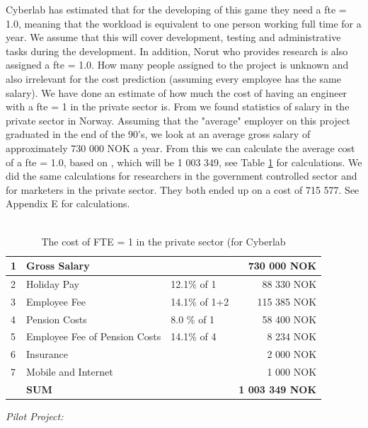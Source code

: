 Cyberlab has estimated that for the developing of this game they need a \ac{fte} = 1.0, meaning that the workload is equivalent to one person working full time for a year. We assume that this will cover development, testing and administrative tasks during the development. In addition, Norut who provides research is also assigned a \ac{fte} = 1.0. How many people assigned to the project is unknown and also irrelevant for the cost prediction (assuming every employee has the same salary). We have done an estimate of how much the cost of having an engineer with a \ac{fte} = 1 in the private sector is. From \cite{tekna} we found statistics of salary in the private sector in Norway. Assuming that the "average" employer on this project graduated in the end of the 90's, we look at an average gross salary of approximately 730 000 NOK a year. From this we can calculate the average cost of a \ac{fte} = 1.0, based on \cite{altinn}, which will be 1 003 349, see Table \ref{tab:costofFTE} for calculations. We did the same calculations for researchers in the government controlled sector and for marketers in the private sector. They both ended up on a cost of 715 577. See Appendix E for calculations.\\ \\
\begin{table}
\centering
    \begin{tabular}{|l|l|l|r|}
        \hline
       1&Gross Salary & & 730 000 NOK \\ \hline
       2&Holiday Pay & 12.1\% of 1  & 88 330 NOK \\ \hline
	   3&Employee Fee & 14.1\% of 1+2  & 115 385 NOK \\ \hline
	   4&Pension Costs & 8.0 \% of 1 & 58 400 NOK\\ \hline
	   5&Employee Fee of Pension Costs & 14.1\% of 4 & 8 234 NOK \\ \hline
	   6&Insurance & & 2 000 NOK \\ \hline
	   7&Mobile and Internet & & 1 000 NOK \\ \hline
	   & \textbf{SUM} & & \textbf{1 003 349 NOK} \\
	    \hline
    \end{tabular}
    \caption[Cost of FTE = 1]{The cost of FTE = 1 in the private sector (for Cyberlab}
    \label{tab:costofFTE}
\end{table}
\emph{Pilot Project:}\\
